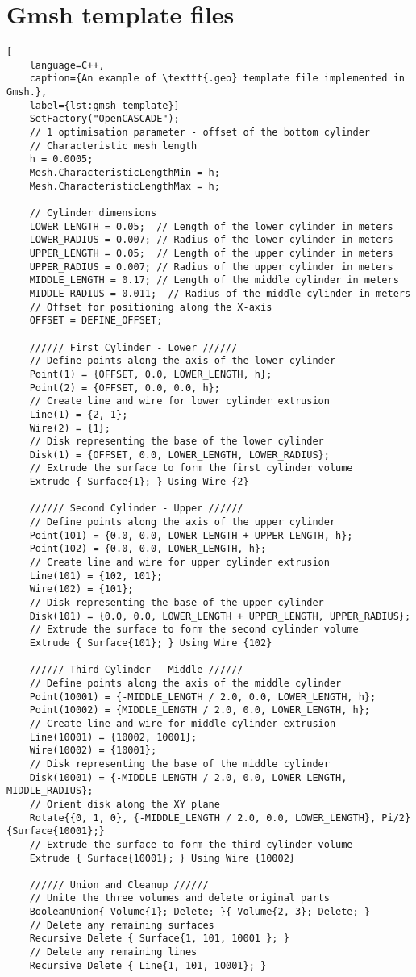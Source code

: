 \chapter{Gmsh template files}\label{appendix B}

\begin{lstlisting}[
	language=C++,
	caption={An example of \texttt{.geo} template file implemented in Gmsh.},
	label={lst:gmsh template}]
	SetFactory("OpenCASCADE");
	// 1 optimisation parameter - offset of the bottom cylinder
	// Characteristic mesh length
	h = 0.0005;
	Mesh.CharacteristicLengthMin = h;
	Mesh.CharacteristicLengthMax = h;
	
	// Cylinder dimensions
	LOWER_LENGTH = 0.05;  // Length of the lower cylinder in meters
	LOWER_RADIUS = 0.007; // Radius of the lower cylinder in meters
	UPPER_LENGTH = 0.05;  // Length of the upper cylinder in meters
	UPPER_RADIUS = 0.007; // Radius of the upper cylinder in meters
	MIDDLE_LENGTH = 0.17; // Length of the middle cylinder in meters
	MIDDLE_RADIUS = 0.011;  // Radius of the middle cylinder in meters
	// Offset for positioning along the X-axis
	OFFSET = DEFINE_OFFSET;
	
	////// First Cylinder - Lower //////
	// Define points along the axis of the lower cylinder
	Point(1) = {OFFSET, 0.0, LOWER_LENGTH, h};
	Point(2) = {OFFSET, 0.0, 0.0, h};
	// Create line and wire for lower cylinder extrusion
	Line(1) = {2, 1};
	Wire(2) = {1};
	// Disk representing the base of the lower cylinder
	Disk(1) = {OFFSET, 0.0, LOWER_LENGTH, LOWER_RADIUS};
	// Extrude the surface to form the first cylinder volume
	Extrude { Surface{1}; } Using Wire {2}
	
	////// Second Cylinder - Upper //////
	// Define points along the axis of the upper cylinder
	Point(101) = {0.0, 0.0, LOWER_LENGTH + UPPER_LENGTH, h};
	Point(102) = {0.0, 0.0, LOWER_LENGTH, h};
	// Create line and wire for upper cylinder extrusion
	Line(101) = {102, 101};
	Wire(102) = {101};
	// Disk representing the base of the upper cylinder
	Disk(101) = {0.0, 0.0, LOWER_LENGTH + UPPER_LENGTH, UPPER_RADIUS};
	// Extrude the surface to form the second cylinder volume
	Extrude { Surface{101}; } Using Wire {102}
	
	////// Third Cylinder - Middle //////
	// Define points along the axis of the middle cylinder
	Point(10001) = {-MIDDLE_LENGTH / 2.0, 0.0, LOWER_LENGTH, h};
	Point(10002) = {MIDDLE_LENGTH / 2.0, 0.0, LOWER_LENGTH, h};
	// Create line and wire for middle cylinder extrusion
	Line(10001) = {10002, 10001};
	Wire(10002) = {10001};
	// Disk representing the base of the middle cylinder
	Disk(10001) = {-MIDDLE_LENGTH / 2.0, 0.0, LOWER_LENGTH, MIDDLE_RADIUS};
	// Orient disk along the XY plane
	Rotate{{0, 1, 0}, {-MIDDLE_LENGTH / 2.0, 0.0, LOWER_LENGTH}, Pi/2}{Surface{10001};}
	// Extrude the surface to form the third cylinder volume
	Extrude { Surface{10001}; } Using Wire {10002}
	
	////// Union and Cleanup //////
	// Unite the three volumes and delete original parts
	BooleanUnion{ Volume{1}; Delete; }{ Volume{2, 3}; Delete; }
	// Delete any remaining surfaces
	Recursive Delete { Surface{1, 101, 10001 }; }
	// Delete any remaining lines
	Recursive Delete { Line{1, 101, 10001}; }
\end{lstlisting}

